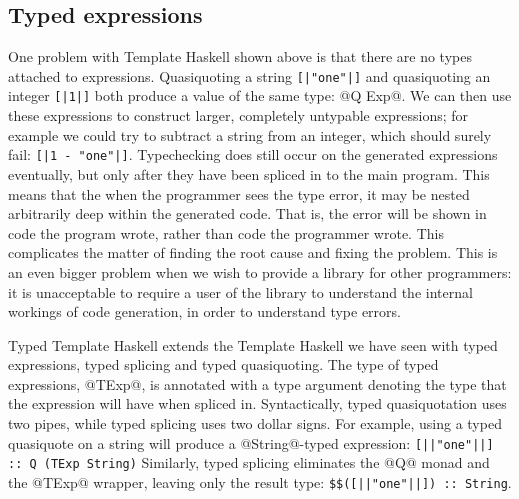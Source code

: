 \subsection{Typed expressions}

One problem with Template Haskell shown above is that there are no types attached to expressions.
Quasiquoting a string \lstinline/[|"one"|]/ and quasiquoting an integer \lstinline/[|1|]/ both produce a value of the same type: @Q Exp@.
We can then use these expressions to construct larger, completely untypable expressions; for example we could try to subtract a string from an integer, which should surely fail: \lstinline/[|1 - "one"|]/.
Typechecking does still occur on the generated expressions eventually, but only after they have been spliced in to the main program.
This means that the when the programmer sees the type error, it may be nested arbitrarily deep within the generated code.
That is, the error will be shown in code the program wrote, rather than code the programmer wrote.
This complicates the matter of finding the root cause and fixing the problem.
This is an even bigger problem when we wish to provide a library for other programmers: it is unacceptable to require a user of the library to understand the internal workings of code generation, in order to understand type errors.


Typed Template Haskell extends the Template Haskell we have seen with typed expressions, typed splicing and typed quasiquoting.
The type of typed expressions, @TExp@, is annotated with a type argument denoting the type that the expression will have when spliced in.
Syntactically, typed quasiquotation uses two pipes, while typed splicing uses two dollar signs.
For example, using a typed quasiquote on a string will produce a @String@-typed expression: \lstinline/[||"one"||] :: Q (TExp String)/
Similarly, typed splicing eliminates the @Q@ monad and the @TExp@ wrapper, leaving only the result type: \lstinline/$$([||"one"||]) :: String/.

